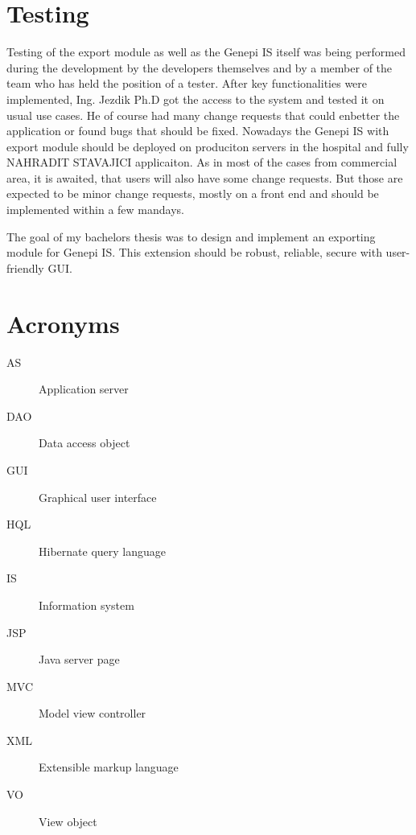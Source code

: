 \documentclass[thesis=B,english]{FITthesis}[2012/10/20]
\begin{document}
\chapter{Testing}
Testing of the export module as well as the Genepi IS itself was being performed during the development by the developers themselves and by a member of the team who has held the position of a tester. After key  functionalities were implemented, Ing. Jezdik Ph.D got the access to the system and tested it on usual use cases. He of course had many change requests that could enbetter the application or found bugs that should be fixed. Nowadays the Genepi IS with export module should be deployed on produciton servers in the hospital and fully NAHRADIT STAVAJICI applicaiton. As in most of the cases from commercial area, it is awaited, that users will also have some change requests. But those are expected to be minor change requests, mostly on a front end and should be implemented within a few mandays.
\begin{conclusion}
The goal of my bachelors thesis was to design and implement an exporting module for Genepi IS. This extension should be robust, reliable, secure with user-friendly GUI. 
\end{conclusion}




\appendix

\chapter{Acronyms}
\begin{description}
	\item[AS] Application server
	\item[DAO] Data access object
	\item[GUI] Graphical user interface
	\item[HQL] Hibernate query language
	\item[IS] Information system
	\item[JSP] Java server page
	\item[MVC] Model view controller
	\item[XML] Extensible markup language
	\item[VO] View object
\end{description}



\end{document}
